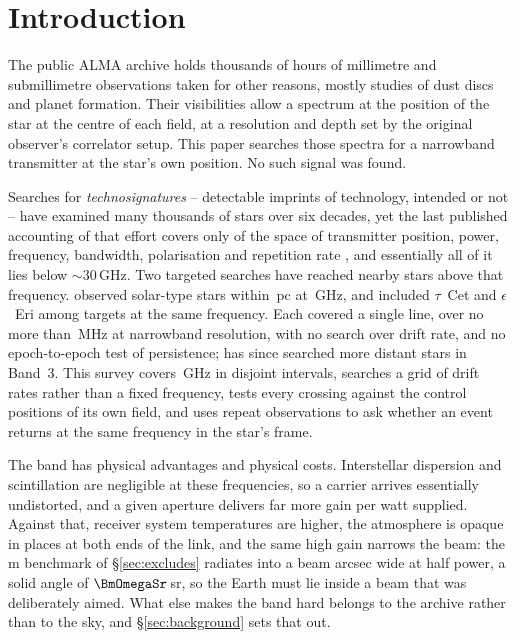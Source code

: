 \section{Introduction}
\label{sec:intro}

The public ALMA archive holds thousands of hours of millimetre and
submillimetre observations taken for other reasons, mostly studies of dust
discs and planet formation. Their visibilities allow a spectrum at the
position of the star at the centre of each field, at a resolution and depth
set by the original observer's correlator setup. This paper searches those
spectra for a narrowband transmitter at the star's own position. No such
signal was found.

Searches for \emph{technosignatures} -- detectable imprints of technology,
intended or not
\citep{Sheikh2020,SETIreview2025} -- have examined many thousands of stars
over six decades, yet the last published accounting of that effort covers
only \HaystackFrac{} of the space of transmitter position, power, frequency,
bandwidth, polarisation and repetition rate
\citep{Wright2018}, and essentially all of it lies below
${\sim}30$\,GHz. Two targeted searches have reached nearby stars above that frequency.
\citet{Steffes1994} observed \SbPriorNStarA{} solar-type stars within
\SbPriorDistA\,pc at \SbPriorFreqGHz\,GHz, and \citet{Mauersberger1996}
included $\tau$~Cet and $\epsilon$~Eri among \SbPriorNStarB{} targets at the
same frequency. Each covered a single line, over no more than
\SbPriorBandMHz\,MHz at narrowband resolution, with no search over drift rate,
and no epoch-to-epoch test of persistence;
\citet{Mason2025} has since searched more distant stars in
Band~3. This survey covers
\DnuA\,GHz in \CovNIslands{} disjoint intervals, searches a grid of drift rates rather
than a fixed frequency, tests every crossing against the \BdNCtrl{} control positions of
its own field, and uses repeat observations to ask whether an event returns
at the same frequency in the star's frame.

The band has physical advantages and physical costs. Interstellar dispersion
and scintillation are negligible at these frequencies, so a carrier arrives
essentially undistorted, and a given aperture delivers far more gain per watt
supplied. Against that, receiver system temperatures are higher, the
atmosphere is opaque in places at both ends of the link, and the same high
gain narrows the beam: the \BenchDiam\,m benchmark of
\S\ref{sec:excludes} radiates into a beam \BmArcsec{} arcsec wide at half
power, a solid angle of $\BmOmegaSr$\,sr, so
the Earth must lie inside a beam that was deliberately aimed. What else makes
the band hard belongs to the archive rather than to the sky, and
\S\ref{sec:background} sets that out.

